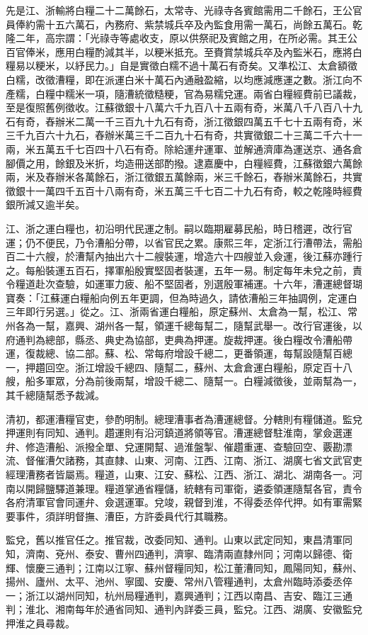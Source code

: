 \begin{pinyinscope}
先是江、浙輸將白糧二十二萬餘石，太常寺、光祿寺各賓館需用二千餘石，王公官員俸約需十五六萬石，內務府、紫禁城兵卒及內監食用需一萬石，尚餘五萬石。乾隆二年，高宗謂：「光祿寺等處收支，原以供祭祀及賓館之用，在所必需。其王公百官俸米，應用白糧酌減其半，以粳米抵充。至賚賞禁城兵卒及內監米石，應將白糧易以粳米，以紓民力。」自是實徵白糯不過十萬石有奇矣。又準松江、太倉額徵白糯，改徵漕糧，即在派運白米十萬石內通融盈縮，以均應減應運之數。浙江向不產糯，白糧中糯米一項，隨漕統徵糙粳，官為易糯兌運。兩省白糧經費前已議裁，至是復照舊例徵收。江蘇徵銀十八萬六千九百八十五兩有奇，米萬八千八百八十九石有奇，舂辦米二萬一千三百九十九石有奇，浙江徵銀四萬五千七十五兩有奇，米三千九百六十九石，舂辦米萬三千二百九十石有奇，共實徵銀二十三萬二千六十一兩，米五萬五千七百四十八石有奇。除給運弁運軍、並解通濟庫為運送京、通各倉腳價之用，餘銀及米折，均造冊送部酌撥。逮嘉慶中，白糧經費，江蘇徵銀六萬餘兩，米及舂辦米各萬餘石，浙江徵銀五萬餘兩，米三千餘石，舂辦米萬餘石，共實徵銀十一萬四千五百十八兩有奇，米五萬三千七百二十九石有奇，較之乾隆時經費銀所減又逾半矣。

江、浙之運白糧也，初沿明代民運之制。嗣以臨期雇募民船，時日稽遲，改行官運；仍不便民，乃令漕船分帶，以省官民之累。康熙三年，定浙江行漕帶法，需船百二十六艘，於漕幫內抽出六十二艘裝運，增造六十四艘並入僉運，後江蘇亦踵行之。每船裝運五百石，擇軍船殷實堅固者裝運，五年一易。制定每年未兌之前，責令糧道赴次查驗，如運軍力疲、船不堅固者，別選殷軍補運。十六年，漕運總督瑚寶奏：「江蘇運白糧船向例五年更調，但為時過久，請依漕船三年抽調例，定運白三年即行另選。」從之。江、浙兩省運白糧船，原定蘇州、太倉為一幫，松江、常州各為一幫，嘉興、湖州各一幫，領運千總每幫二，隨幫武舉一。改行官運後，以府通判為總部，縣丞、典史為協部，吏典為押運。旋裁押運。後白糧改令漕船帶運，復裁總、協二部。蘇、松、常每府增設千總二，更番領運，每幫設隨幫百總一，押趲回空。浙江增設千總四、隨幫二，蘇州、太倉倉運白糧船，原定百十八艘，船多軍眾，分為前後兩幫，增設千總二、隨幫一。白糧減徵後，並兩幫為一，其千總隨幫悉予裁減。

清初，都運漕糧官吏，參酌明制。總理漕事者為漕運總督。分轄則有糧儲道。監兌押運則有同知、通判。趲運則有沿河鎮道將領等官。漕運總督駐淮南，掌僉選運弁、修造漕船、派撥全單、兌運開幫、過淮盤掣、催趲重運、查驗回空、覈勘漂流、督催漕欠諸務，其直隸、山東、河南、江西、江南、浙江、湖廣七省文武官吏經理漕務者皆屬焉。糧道，山東、江安、蘇松、江西、浙江、湖北、湖南各一。河南以開歸鹽驛道兼理。糧道掌通省糧儲，統轄有司軍衛，遴委領運隨幫各官，責令各府清軍官會同運弁、僉選運軍。兌竣，親督到淮，不得委丞倅代押。如有軍需緊要事件，須詳明督撫、漕臣，方許委員代行其職務。

監兌，舊以推官任之。推官裁，改委同知、通判。山東以武定同知，東昌清軍同知，濟南、兗州、泰安、曹州四通判，濟寧、臨清兩直隸州同；河南以歸德、衛輝、懷慶三通判；江南以江寧、蘇州督糧同知，松江董漕同知，鳳陽同知，蘇州、揚州、廬州、太平、池州、寧國、安慶、常州八管糧通判，太倉州臨時添委丞倅一；浙江以湖州同知，杭州局糧通判，嘉興通判；江西以南昌、吉安、臨江三通判；淮北、湘南每年於通省同知、通判內詳委三員，監兌。江西、湖廣、安徽監兌押淮之員尋裁。


\end{pinyinscope}
